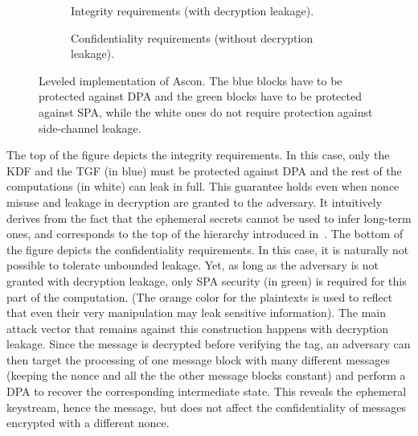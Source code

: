 \documentclass{llncs}
\begin{document}
\begin{figure}[h]
    \begin{subfigure}{\textwidth} \centering
	\caption{Integrity requirements (with decryption leakage).}
	\end{subfigure}
	\begin{subfigure}{\textwidth} \centering
	\caption{Confidentiality requirements (without decryption leakage).}
	\end{subfigure}
        \caption{Leveled implementation of Ascon.
            The blue blocks have to be protected against DPA and the green blocks
            have to be protected against SPA, while the white ones do not require
            protection against side-channel leakage.
        }
        \label{fig:Ascon}
\end{figure}

\medskip

The top of the figure depicts the integrity requirements. In this case, only
the KDF and the TGF (in blue) must be protected against DPA  and the rest of the computations (in white)
can leak in full. This guarantee holds even when nonce misuse and
leakage in decryption are granted to the adversary. It intuitively derives
from the fact that the ephemeral secrets cannot be used to infer long-term ones,
and corresponds to the top of the hierarchy introduced in~\cite{DBLP:conf/latincrypt/GuoPPS19}.
The bottom of the figure 
depicts the confidentiality requirements. In this case, it is naturally 
not possible to tolerate unbounded leakage. Yet, as long as the adversary 
is not granted with decryption leakage, only SPA security (in green) is required 
for this part of the computation. (The orange color for the plaintexts
is used to reflect that even their very manipulation may leak sensitive information).
The main attack vector that remains against this construction happens
with decryption leakage. Since the message is decrypted before
verifying the tag, an adversary can then 
target the processing of one message block with many different
messages (keeping the nonce and all the the other message blocks constant) and perform
a DPA to recover the corresponding intermediate state.
This reveals the ephemeral keystream, hence the message, but does not
affect the confidentiality of messages encrypted with a different nonce.
\end{document}
